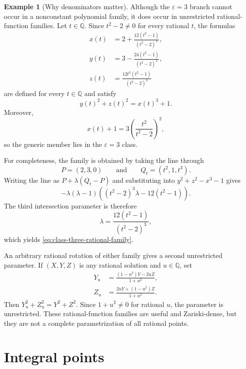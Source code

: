 \documentclass[11pt,a4paper]{article}
\numberwithin{equation}{section}
\theoremstyle{definition}
\newtheorem{example}[theorem]{Example}
\newcommand{\Q}{\mathbb Q}
\begin{document}
\begin{example}[Why denominators matter]
Although the $\varepsilon=3$ branch cannot occur in a nonconstant polynomial
family, it does occur in unrestricted rational-function families.  Let
$t\in\Q$.  Since $t^2-2\ne0$ for every rational $t$, the formulas
\begin{equation}
 \begin{aligned}
 x(t)&=2+\frac{12(t^2-1)}{(t^2-2)^2},\\
 y(t)&=3-\frac{24(t^2-1)}{(t^2-2)^3},\\
 z(t)&=\frac{12t^3(t^2-1)}{(t^2-2)^3}
 \end{aligned}
 \label{eq:class-three-rational-family}
\end{equation}
are defined for every $t\in\Q$ and satisfy
\[
 y(t)^2+z(t)^2=x(t)^3+1.
\]
Moreover,
\begin{equation}
 x(t)+1=3\left(\frac{t^2}{t^2-2}\right)^2,
 \label{eq:class-three-norm-class}
\end{equation}
so the generic member lies in the $\varepsilon=3$ class.

For completeness, the family is obtained by taking the line through
\[
 P=(2,3,0)
 \qquad\text{and}\qquad
 Q_t=(t^2,1,t^3).
\]
Writing the line as $P+\lambda(Q_t-P)$ and substituting into
$y^2+z^2-x^3-1$ gives
\[
 -\lambda(\lambda-1)
 \left((t^2-2)^3\lambda-12(t^2-1)\right).
\]
The third intersection parameter is therefore
\[
 \lambda=\frac{12(t^2-1)}{(t^2-2)^3},
\]
which yields \eqref{eq:class-three-rational-family}.
\end{example}

An arbitrary rational rotation of either family gives a second unrestricted
parameter.  If $(X,Y,Z)$ is any rational solution and $u\in\Q$, set
\begin{equation}
 \begin{aligned}
 Y_u&=\frac{(1-u^2)Y-2uZ}{1+u^2},\\
 Z_u&=\frac{2uY+(1-u^2)Z}{1+u^2}.
 \end{aligned}
 \label{eq:rational-rotation}
\end{equation}
Then $Y_u^2+Z_u^2=Y^2+Z^2$.  Since $1+u^2\ne0$ for rational $u$, the
parameter is unrestricted.  These rational-function families are useful and
Zariski-dense, but they are not a complete parametrization of all rational
points.

\section{Integral points}
\end{document}
